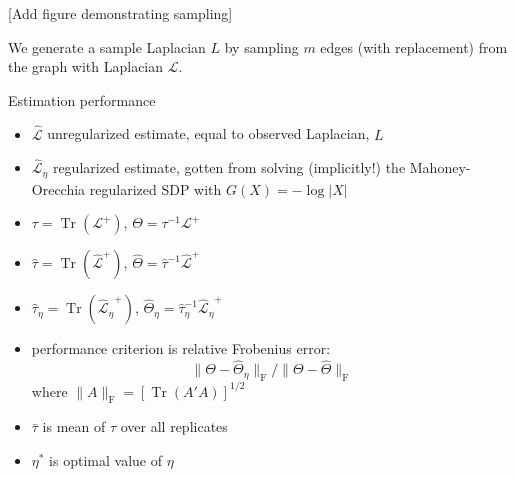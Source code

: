 \documentclass[xcolor=dvipsnames]{beamer}
\DeclareMathOperator{\Tr}{Tr}
\begin{document}
\begin{frame}{}
  [Add figure demonstrating sampling]

  We generate a sample Laplacian $L$ by sampling $m$ edges (with replacement)
  from the graph with Laplacian $\mathcal{L}$.
\end{frame}

\begin{frame}
  \begin{block}{Estimation performance}
    \begin{itemize}
      \item $\mathcal{\hat L}$ unregularized estimate, equal to observed Laplacian, $L$
      \item $\mathcal{\hat L}_\eta$ regularized estimate, gotten from solving (implicitly!) the
        Mahoney-Orecchia regularized SDP with $G(X) = -\log |X|$
      \item $\tau = \Tr(\mathcal{L}^+)$, $\Theta = \tau^{-1} \mathcal{L}^+$
      \item $\hat \tau = \Tr(\mathcal{\hat L}^+)$, $\hat \Theta = \hat \tau^{-1} \mathcal{\hat L}^+$
      \item $\hat \tau_\eta = \Tr(\mathcal{\hat L_\eta}^+)$, $\hat \Theta_\eta = \hat \tau_\eta^{-1} \mathcal{\hat L_\eta}^+$
      \item performance criterion is relative Frobenius error:
        \[
	  \|\Theta - \hat \Theta_\eta\|_\mathrm{F} / \|\Theta - \hat \Theta \|_\mathrm{F}
	\]
	where $\|A\|_\mathrm{F} = [\Tr(A' A)]^{1/2}$
      \item $\bar \tau$ is mean of $\tau$ over all replicates
      \item $\eta^\ast$ is optimal value of $\eta$
    \end{itemize}
  \end{block}
\end{frame}
\end{document}

